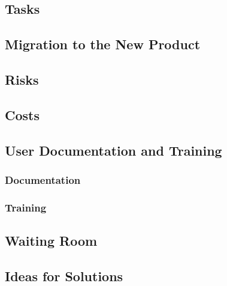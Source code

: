 \documentclass{article}
\begin{document}
\subsection{Tasks}
\subsection{Migration to the New Product}
\subsection{Risks}
\subsection{Costs}
\subsection{User Documentation and Training}
\subsubsection{Documentation}
\subsubsection{Training}
\subsection{Waiting Room}
\subsection{Ideas for Solutions}
\end{document}
